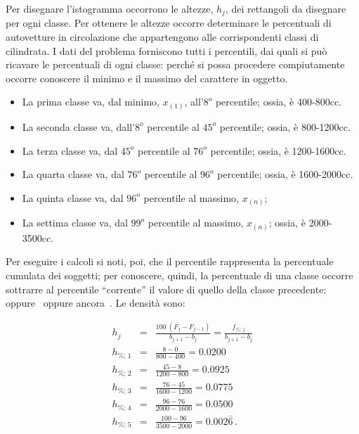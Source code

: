 \documentclass[
  11pt,
]{book}
\providecommand{\tightlist}{%
  \setlength{\itemsep}{0pt}\setlength{\parskip}{0pt}}
\theoremstyle{mytheoremstyle}
\theoremstyle{mydefstyle}
\newenvironment{sol}
  {
  \begin{tcolorbox}[enhanced,breakable,arc=0.1mm,boxrule=1pt,colback=white,colframe=iblue,
  title=\bf \fontfamily{lmss}\selectfont \hspace{.5 cm} Soluzione,drop fuzzy shadow]

}{
\end{tcolorbox}
  }
\begin{document}
\begin{sol}

Per disegnare l'istogramma occorrono le altezze, \(h_{j}\),
dei rettangoli da disegnare per ogni classe.
Per ottenere le altezze occorre determinare le percentuali di
autovetture in circolazione che appartengono alle corrispondenti
classi di cilindrata.
I dati del problema forniscono tutti i percentili, dai quali si
può ricavare le percentuali di ogni classe: perché si possa
procedere compiutamente occorre conoscere il minimo e il massimo
del carattere in oggetto.

\begin{itemize}
\tightlist
\item
  La prima classe va, dal minimo, \(x_{(1)}\), all'\(8^{o}\) percentile;
  ossia, è 400-800cc.
\item
  La seconda classe va, dall'\(8^{o}\) percentile al \(45^{o}\) percentile;
  ossia, è 800-1200cc.
\item
  La terza classe va, dal \(45^{o}\) percentile al \(76^{o}\) percentile;
  ossia, è 1200-1600cc.
\item
  La quarta classe va, dal \(76^{o}\) percentile al \(96^{o}\) percentile;
  ossia, è 1600-2000cc.
\item
  La quinta classe va, dal \(96^{o}\) percentile al massimo, \(x_{(n)}\);
\item
  La settima classe va, dal \(99^{o}\) percentile al massimo, \(x_{(n)}\);
  ossia, è 2000-3500cc.
\end{itemize}

Per eseguire i calcoli si noti, poi, che il percentile rappresenta
la percentuale cumulata dei soggetti; per conoscere, quindi, la
percentuale di una classe occorre sottrarre al percentile
``corrente'' il valore di quello della classe precedente:
\(\,\) oppure
\(\,\) oppure ancora
\(\,\).
Le densità sono:

\begin{eqnarray*}
h_{j} &=& \frac{100\ (F_{j} - F_{j-1})} {b_{j+1} - b_{j}}
       =  \frac{f_{\%;\, j}} {b_{j+1} - b_{j}} \\
h_{\%;\, 1} &=& \frac{  8 -  0} { 800 -  400} =  0.0200     \\
h_{\%;\, 2} &=& \frac{ 45 -  8} {1200 -  800} =  0.0925     \\
h_{\%;\, 3} &=& \frac{ 76 - 45} {1600 - 1200} =  0.0775     \\
h_{\%;\, 4} &=& \frac{ 96 - 76} {2000 - 1600} =  0.0500     \\
h_{\%;\, 5} &=& \frac{100 - 96} {3500 - 2000} =  0.002\bar{6} \, .
\end{eqnarray*}


\end{sol}
\end{document}
